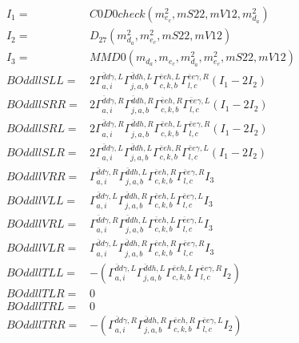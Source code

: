 \documentclass[A4,landscape]{article}
\begin{document}
\begin{align} 
I_1 = & C0D0check(m^2_{e_{{c}}}, mS22, mV12, m^2_{d_{{a}}}) \\ 
I_2 = & D_{27}(m^2_{d_{{a}}}, m^2_{e_{{c}}}, mS22, mV12) \\ 
I_3 = & MMD0(m_{d_{{a}}}, m_{e_{{c}}}, m^2_{d_{{a}}}, m^2_{e_{{c}}}, mS22, mV12) \\ 
  BOddllSLL= & 2  \Gamma^{\bar{d}d \gamma ,L}_{a, i} \Gamma^{\bar{d}d h ,L}_{j, a, b} \Gamma^{\bar{e}e h ,L}_{c, k, b} \Gamma^{\bar{e}e \gamma ,R}_{l, c} (I_1 - 2 I_2) \\ 
  BOddllSRR= & 2  \Gamma^{\bar{d}d \gamma ,R}_{a, i} \Gamma^{\bar{d}d h ,R}_{j, a, b} \Gamma^{\bar{e}e h ,R}_{c, k, b} \Gamma^{\bar{e}e \gamma ,L}_{l, c} (I_1 - 2 I_2) \\ 
  BOddllSRL= & 2  \Gamma^{\bar{d}d \gamma ,R}_{a, i} \Gamma^{\bar{d}d h ,R}_{j, a, b} \Gamma^{\bar{e}e h ,L}_{c, k, b} \Gamma^{\bar{e}e \gamma ,R}_{l, c} (I_1 - 2 I_2) \\ 
  BOddllSLR= & 2  \Gamma^{\bar{d}d \gamma ,L}_{a, i} \Gamma^{\bar{d}d h ,L}_{j, a, b} \Gamma^{\bar{e}e h ,R}_{c, k, b} \Gamma^{\bar{e}e \gamma ,L}_{l, c} (I_1 - 2 I_2) \\ 
  BOddllVRR= &  \Gamma^{\bar{d}d \gamma ,R}_{a, i} \Gamma^{\bar{d}d h ,L}_{j, a, b} \Gamma^{\bar{e}e h ,R}_{c, k, b} \Gamma^{\bar{e}e \gamma ,R}_{l, c} I_3 \\ 
  BOddllVLL= &  \Gamma^{\bar{d}d \gamma ,L}_{a, i} \Gamma^{\bar{d}d h ,R}_{j, a, b} \Gamma^{\bar{e}e h ,L}_{c, k, b} \Gamma^{\bar{e}e \gamma ,L}_{l, c} I_3 \\ 
  BOddllVRL= &  \Gamma^{\bar{d}d \gamma ,R}_{a, i} \Gamma^{\bar{d}d h ,L}_{j, a, b} \Gamma^{\bar{e}e h ,L}_{c, k, b} \Gamma^{\bar{e}e \gamma ,L}_{l, c} I_3 \\ 
  BOddllVLR= &  \Gamma^{\bar{d}d \gamma ,L}_{a, i} \Gamma^{\bar{d}d h ,R}_{j, a, b} \Gamma^{\bar{e}e h ,R}_{c, k, b} \Gamma^{\bar{e}e \gamma ,R}_{l, c} I_3 \\ 
  BOddllTLL= & -( \Gamma^{\bar{d}d \gamma ,L}_{a, i} \Gamma^{\bar{d}d h ,L}_{j, a, b} \Gamma^{\bar{e}e h ,L}_{c, k, b} \Gamma^{\bar{e}e \gamma ,R}_{l, c} I_2) \\ 
  BOddllTLR= & 0 \\ 
  BOddllTRL= & 0 \\ 
  BOddllTRR= & -( \Gamma^{\bar{d}d \gamma ,R}_{a, i} \Gamma^{\bar{d}d h ,R}_{j, a, b} \Gamma^{\bar{e}e h ,R}_{c, k, b} \Gamma^{\bar{e}e \gamma ,L}_{l, c} I_2) \\ 
\end{align} 
\end{document}
